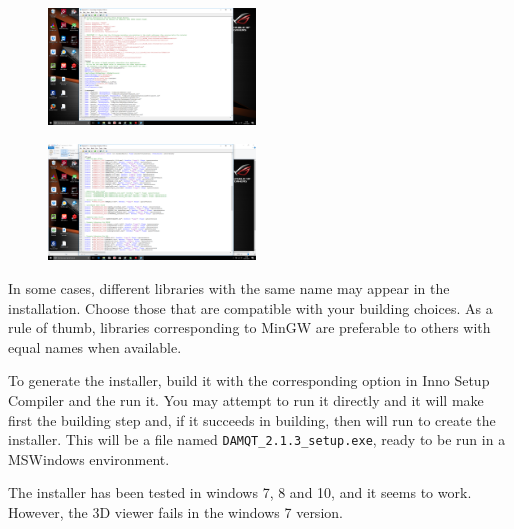 \documentclass[a4paper,10pt]{article}
\begin{document}
\begin{minipage}{0.5\linewidth}
\begin{figure}[H]
\begin{center}
\includegraphics[width=5.5cm]{fig22.png}
\vspace*{-1mm}
\caption{\small  \label{fig:22}}
\end{center}
\end{figure}
\end{minipage}
\begin{minipage}{0.5\linewidth}
\begin{figure}[H]
\begin{center}
\includegraphics[width=5.5cm]{fig23.png}
\vspace*{-1mm}
\caption{\small  \label{fig:23}}
\end{center}
\end{figure}
\end{minipage}

In some cases, different libraries with the same name may appear in the installation. Choose those that
are compatible with your building choices. As a rule of thumb, libraries corresponding to MinGW are
preferable to others with equal names when available.

To generate the installer, build it with the corresponding option in Inno Setup Compiler and the run it.
You may attempt to run it directly and it will make first the building step and, if it succeeds in building, 
then will run to create the installer. This will be a file named \texttt{DAMQT\_2.1.3\_setup.exe},
ready to be run in a MSWindows environment.

The installer has been tested in windows 7, 8 and 10, and it seems to work. However, the 3D viewer fails in the
windows 7 version. 
\end{document}
